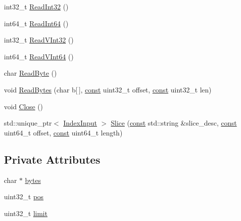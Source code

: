 \begin{DoxyCompactItemize}
\item 
int32\+\_\+t \mbox{\hyperlink{classlucene_1_1core_1_1store_1_1BytesArrayReferenceIndexInput_a3b2a098ccf0748f67d88cf8050c07a5e}{Read\+Int32}} ()
\item 
int64\+\_\+t \mbox{\hyperlink{classlucene_1_1core_1_1store_1_1BytesArrayReferenceIndexInput_aad3b9103a7ef676a76e276a42cedaa38}{Read\+Int64}} ()
\item 
int32\+\_\+t \mbox{\hyperlink{classlucene_1_1core_1_1store_1_1BytesArrayReferenceIndexInput_a44ae6dbf65e69e5a2a414c02687e4d47}{Read\+V\+Int32}} ()
\item 
int64\+\_\+t \mbox{\hyperlink{classlucene_1_1core_1_1store_1_1BytesArrayReferenceIndexInput_a90480274a6aae4a6eca547d0316d0f28}{Read\+V\+Int64}} ()
\item 
char \mbox{\hyperlink{classlucene_1_1core_1_1store_1_1BytesArrayReferenceIndexInput_a4441afb049c518c35987a22c01b1e4e0}{Read\+Byte}} ()
\item 
void \mbox{\hyperlink{classlucene_1_1core_1_1store_1_1BytesArrayReferenceIndexInput_a944168ab1d79ae43706bbf333f4dea56}{Read\+Bytes}} (char b\mbox{[}$\,$\mbox{]}, \mbox{\hyperlink{ZlibCrc32_8h_a2c212835823e3c54a8ab6d95c652660e}{const}} uint32\+\_\+t offset, \mbox{\hyperlink{ZlibCrc32_8h_a2c212835823e3c54a8ab6d95c652660e}{const}} uint32\+\_\+t len)
\item 
void \mbox{\hyperlink{classlucene_1_1core_1_1store_1_1BytesArrayReferenceIndexInput_a99a7277bb3fd32f5d184f31c1fa05c5f}{Close}} ()
\item 
std\+::unique\+\_\+ptr$<$ \mbox{\hyperlink{classlucene_1_1core_1_1store_1_1IndexInput}{Index\+Input}} $>$ \mbox{\hyperlink{classlucene_1_1core_1_1store_1_1BytesArrayReferenceIndexInput_a6519e4407cfb07a21032fe2252870d5f}{Slice}} (\mbox{\hyperlink{ZlibCrc32_8h_a2c212835823e3c54a8ab6d95c652660e}{const}} std\+::string \&slice\+\_\+desc, \mbox{\hyperlink{ZlibCrc32_8h_a2c212835823e3c54a8ab6d95c652660e}{const}} uint64\+\_\+t offset, \mbox{\hyperlink{ZlibCrc32_8h_a2c212835823e3c54a8ab6d95c652660e}{const}} uint64\+\_\+t length)
\end{DoxyCompactItemize}
\subsection*{Private Attributes}
\begin{DoxyCompactItemize}
\item 
char $\ast$ \mbox{\hyperlink{classlucene_1_1core_1_1store_1_1BytesArrayReferenceIndexInput_aafe03354e9d36c3ddf3eb3cfdfa8c272}{bytes}}
\item 
uint32\+\_\+t \mbox{\hyperlink{classlucene_1_1core_1_1store_1_1BytesArrayReferenceIndexInput_a90500a442e5db7e101ba8efd9a188a09}{pos}}
\item 
uint32\+\_\+t \mbox{\hyperlink{classlucene_1_1core_1_1store_1_1BytesArrayReferenceIndexInput_ac1466fc18792ab0f2b0d01a1d926c890}{limit}}
\end{DoxyCompactItemize}
